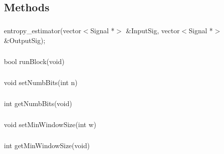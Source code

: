 \subsection*{Methods}
\subparagraph*{}
entropy\_estimator(vector$<$Signal *$>$ \&InputSig, vector$<$Signal *$>$ \&OutputSig);
\subparagraph*{}
bool runBlock(void)
\subparagraph*{}
void setNumbBits(int n)
\subparagraph*{}
int getNumbBits(void)
\subparagraph*{}
void setMinWindowSize(int w)
\subparagraph*{}
int getMinWindowSize(void)






